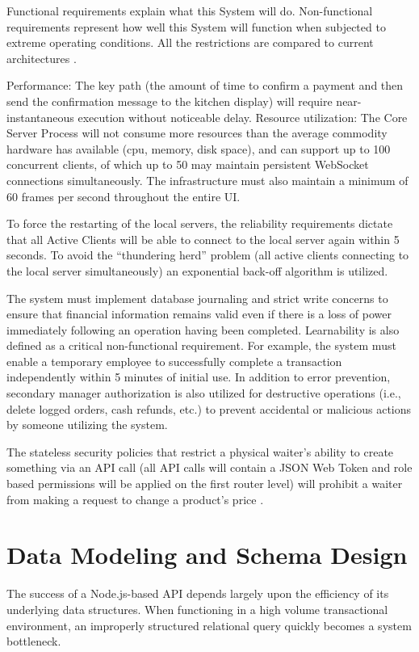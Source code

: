 Functional requirements explain what this System will do. Non-functional requirements represent how well this System will function when subjected to extreme operating conditions. All the restrictions are compared to current architectures \cite{iso25010}. 

Performance: The key path (the amount of time to confirm a payment and then send the confirmation message to the kitchen display) will require near-instantaneous execution without noticeable delay. Resource utilization: The Core Server Process will not consume more resources than the average commodity hardware has available (cpu, memory, disk space), and can support up to 100 concurrent clients, of which up to 50 may maintain persistent WebSocket connections simultaneously. The infrastructure must also maintain a minimum of 60 frames per second throughout the entire UI.

To force the restarting of the local servers, the reliability requirements dictate that all Active Clients will be able to connect to the local server again within 5 seconds. To avoid the ``thundering herd'' problem (all active clients connecting to the local server simultaneously) an exponential back-off algorithm is utilized. 

The system must implement database journaling and strict write concerns to ensure that financial information remains valid even if there is a loss of power immediately following an operation having been completed. Learnability is also defined as a critical non-functional requirement. For example, the system must enable a temporary employee to successfully complete a transaction independently within 5 minutes of initial use. In addition to error prevention, secondary manager authorization is also utilized for destructive operations (i.e., delete logged orders, cash refunds, etc.) to prevent accidental or malicious actions by someone utilizing the system. 

The stateless security policies that restrict a physical waiter's ability to create something via an API call (all API calls will contain a JSON Web Token and role based permissions will be applied on the first router level) will prohibit a waiter from making a request to change a product's price \cite{ferraiolo1992rbac}.

\section{Data Modeling and Schema Design}

The success of a Node.js-based API depends largely upon the efficiency of its underlying data structures. When functioning in a high volume transactional environment, an improperly structured relational query quickly becomes a system bottleneck.

